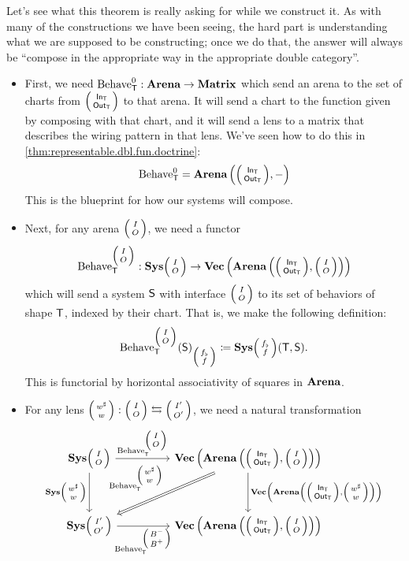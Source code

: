 \documentclass[DynamicalBook]{subfiles}
\begin{document}
Let's see what this theorem is really asking for while we construct it. As with
many of the constructions we have been seeing, the hard part is understanding
what we are supposed to be constructing; once we do that, the answer will always
be ``compose in the appropriate way in the appropriate double category''.
\begin{itemize}
  \item First, we need $\mathrm{Behave}_{\mathsf{T}}^0 : \textbf{Arena} \to
    \textbf{Matrix}$ which send an arena to the set of charts from
    $\lens{\In{T}}{\Out{T}}$ to that arena. It will send a chart to the function
    given by composing with that chart, and it will send a lens to a matrix that
    describes the wiring pattern in that lens. We've seen how to do this in \cref{thm:representable.dbl.fun.doctrine}:
    $$\Fun{Behave}^0_{\Sys{T}} = \Cat{Arena}\left( \littlelens{\In{T}}{\Out{T}},
      -\right)$$
This is the blueprint for how our systems will compose.
  \item Next, for any arena $\lens{I}{O}$, we need a functor
    \[\Fun{Behave}_{\Sys{T}}^{\littlelens{I}{O}} :
    \Cat{Sys}\littlelens{I}{O} \to \Cat{Vec}\left( \Cat{Arena}\left( \littlelens{\In{T}}{\Out{T}},
      \littlelens{I}{O}\right) \right)\]
    which will send a system $\mathsf{S}$ with interface $\lens{I}{O}$ to its
    set of behaviors of shape $\mathsf{T}$, indexed by their chart. That is, we
    make the following definition:
   \[
\Fun{Behave}_{\Sys{T}}^{\littlelens{I}{O}}(\Sys{S})_{\littlelens{f_{\flat}}{f}}
\coloneqq \Cat{Sys}\littlelens{f_{\flat}}{f}(\Sys{T}, \Sys{S}). 
\]
This is functorial by horizontal associativity of squares in $\textbf{Arena}$.
\item For any lens $\lens{w^{\sharp}}{w} : \lens{I}{O} \fromto \lens{I'}{O'}$,
  we need a natural transformation
  \[
    \begin{tikzcd}
\Cat{Sys}\lens{I}{O} \ar[dd, "{\Cat{Sys}\littlelens{w^{\sharp}}{w}}"'] \ar[rr, "{\Fun{Behave}_{\Sys{T}}^{\littlelens{I}{O}}}"] & & \Cat{Vec}\left( \Cat{Arena}\left(
    \littlelens{\In{T}}{\Out{T}}, \littlelens{I}{O} \right) \right) \ar[dd, "{\Cat{Vec}\left(
  \Cat{Arena}\left( \littlelens{\In{T}}{\Out{T}}, \littlelens{w^{\sharp}}{w}
  \right)\right)}"] \ar[ddll, Rightarrow, "{\Fun{Behave}_{\Sys{T}}^{\littlelens{w^{\sharp}}{w}}}"']\\
 & & \\
\Cat{Sys}\lens{I'}{O'}  \ar[rr, "{\Fun{Behave}_{\Sys{T}}^{\littlelens{B^-}{B^+}} }"']& & \Cat{Vec}\left( \Cat{Arena}\left(
    \littlelens{\In{T}}{\Out{T}}, \littlelens{I}{O} \right) \right) \\

\end{tikzcd}\]
\end{itemize}
\end{document}
